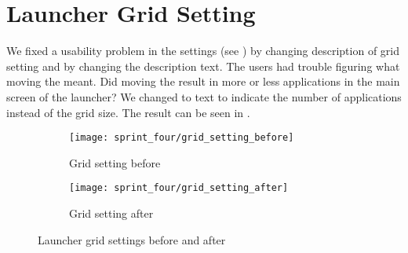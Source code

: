 
\section{Launcher Grid Setting}
\label{sec:launcher_grid_setting}
We fixed a usability problem in the \launcher settings (see ) by changing description of grid setting and by changing the description text. The users had trouble figuring what moving the  meant. Did moving the  result in more or less applications in the main screen of the launcher? We changed to text to indicate the number of applications instead of the grid size. The result can be seen in . 

\begin{figure}[!htbp]
    \centering

    \begin{subfigure}[t]{0.75\textwidth}
        \texttt{[image: sprint\_four/grid\_setting\_before]}
        \caption{Grid setting before}
        \label{fig:launcher_grid_settings_old}
        \vspace*{1cm}
    \end{subfigure}
    \begin{subfigure}[t]{0.75\textwidth}
        \texttt{[image: sprint\_four/grid\_setting\_after]}
        \caption{Grid setting after}
        \label{fig:launcher_grid_settings_new}
    \end{subfigure}
    
    \caption{Launcher grid settings before and after}
    \label{fig:launcher_grid_settings}
\end{figure}
